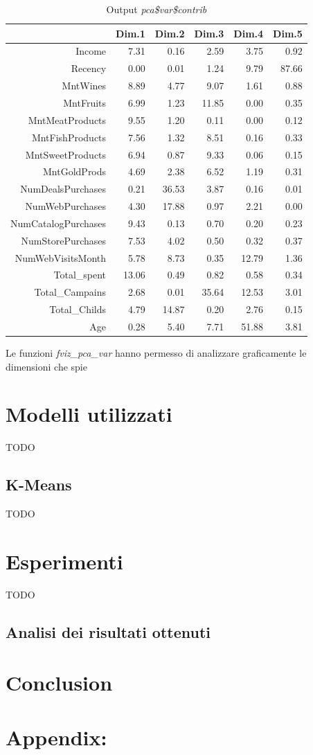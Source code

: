 \documentclass[letterpaper,11pt]{article}
\begin{document}
\begin{table}[h!t]
\centering
\begin{tabular}{rrrrrr}
  \hline
 & Dim.1 & Dim.2 & Dim.3 & Dim.4 & Dim.5 \\ 
  \hline
Income & 7.31 & 0.16 & 2.59 & 3.75 & 0.92 \\ 
  Recency & 0.00 & 0.01 & 1.24 & 9.79 & 87.66 \\ 
  MntWines & 8.89 & 4.77 & 9.07 & 1.61 & 0.88 \\ 
  MntFruits & 6.99 & 1.23 & 11.85 & 0.00 & 0.35 \\ 
  MntMeatProducts & 9.55 & 1.20 & 0.11 & 0.00 & 0.12 \\ 
  MntFishProducts & 7.56 & 1.32 & 8.51 & 0.16 & 0.33 \\ 
  MntSweetProducts & 6.94 & 0.87 & 9.33 & 0.06 & 0.15 \\ 
  MntGoldProds & 4.69 & 2.38 & 6.52 & 1.19 & 0.31 \\ 
  NumDealsPurchases & 0.21 & 36.53 & 3.87 & 0.16 & 0.01 \\ 
  NumWebPurchases & 4.30 & 17.88 & 0.97 & 2.21 & 0.00 \\ 
  NumCatalogPurchases & 9.43 & 0.13 & 0.70 & 0.20 & 0.23 \\ 
  NumStorePurchases & 7.53 & 4.02 & 0.50 & 0.32 & 0.37 \\ 
  NumWebVisitsMonth & 5.78 & 8.73 & 0.35 & 12.79 & 1.36 \\ 
  Total\_spent & 13.06 & 0.49 & 0.82 & 0.58 & 0.34 \\ 
  Total\_Campains & 2.68 & 0.01 & 35.64 & 12.53 & 3.01 \\ 
  Total\_Childs & 4.79 & 14.87 & 0.20 & 2.76 & 0.15 \\ 
  Age & 0.28 & 5.40 & 7.71 & 51.88 & 3.81 \\ 
   \hline
\end{tabular}
\caption{Output \textit{pca\$var\$contrib}}
\label{fig:pca$var$contrib}
\end{table}
Le funzioni \textit{fviz\_pca\_var} hanno permesso di analizzare graficamente le dimensioni che spie

\section{Modelli utilizzati}
TODO
\subsection{K-Means}
TODO

\section{Esperimenti}
TODO

\subsection{Analisi dei risultati ottenuti}

\section{Conclusion}


\appendix

\section*{Appendix: }
\end{document}
